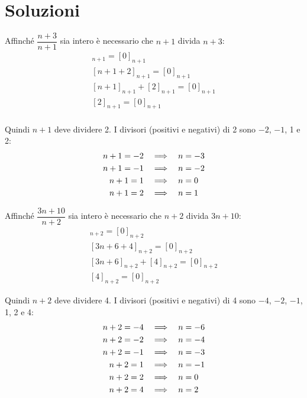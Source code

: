 \chapter{Soluzioni}
\label{ch:soluzioni}


\begin{soluzione}

    Affinché $\dfrac{n + 3}{n + 1}$ sia intero è necessario che $n+1$ divida $n+3$:
    \begin{gather*}
        [n + 3]_{n + 1} = [0]_{n+1} \\
        [n + 1 + 2]_{n + 1} = [0]_{n+1} \\
        [n + 1]_{n+1} + [2]_{n + 1} = [0]_{n+1} \\
        [2]_{n + 1} = [0]_{n+1} \\
    \end{gather*}

    Quindi $n+1$ deve dividere 2.
    I divisori (positivi e negativi) di 2 sono $-2$, $-1$, 1 e 2:
    \begin{align*}
        n + 1 = -2 & \quad\Longrightarrow\quad  n = -3 \\
        n + 1 = -1 & \quad\Longrightarrow\quad  n = -2 \\
        n + 1 = 1 & \quad\Longrightarrow\quad  n = 0 \\
        n + 1 = 2 & \quad\Longrightarrow\quad  n = 1
    \end{align*}

    Affinché $\dfrac{3n + 10}{n + 2}$ sia intero è necessario che $n+2$ divida $3n+10$:
    \begin{gather*}
        [3n+10]_{n+2} = [0]_{n+2} \\
        [3n + 6 + 4]_{n+2} = [0]_{n+2} \\
        [3n + 6]_{n+2} + [4]_{n+2} = [0]_{n+2} \\
        [4]_{n+2} = [0]_{n+2}
    \end{gather*}

    Quindi $n+2$ deve dividere 4.
    I divisori (positivi e negativi) di 4 sono $-4$, $-2$, $-1$, 1, 2 e 4:
    \begin{align*}
        n+2 = -4 & \quad\Longrightarrow\quad  n = -6 \\
        n+2 = -2 & \quad\Longrightarrow\quad  n = -4 \\
        n+2 = -1 & \quad\Longrightarrow\quad  n = -3 \\
        n+2 = 1 & \quad\Longrightarrow\quad  n = -1 \\
        n+2 = 2 & \quad\Longrightarrow\quad  n = 0 \\
        n+2 = 4 & \quad\Longrightarrow\quad  n = 2
    \end{align*}


\end{soluzione}

